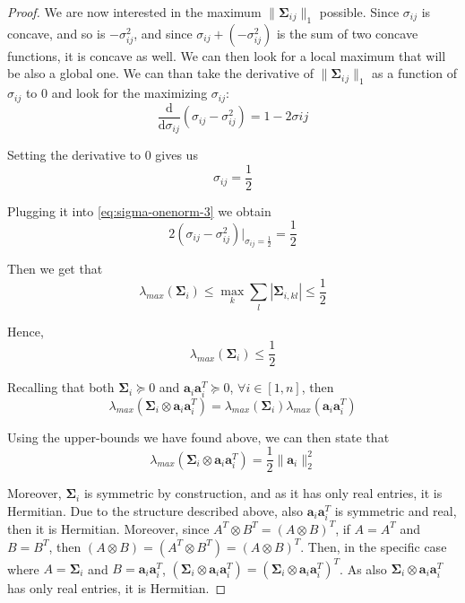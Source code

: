\documentclass[12pt]{article}
\newcommand{\aat}{\mathbf{a}_{i} \mathbf{a}_{i}^{T}}
\newcommand{\bigsigma}{\mathbf{\Sigma}_{i}}
\begin{document}
\begin{proof}
We are now interested in the maximum $\lVert \bigsigma{}_{j} \rVert_{1}$ possible. Since $\sigma_{ij}$ is concave, and so is $-\sigma_{ij}^{2}$, and since $\sigma_{ij} + (-\sigma_{ij}^{2})$ is the sum of two concave functions, it is concave as well. We can then look for a local maximum that will be also a global one. We can than take the derivative of $ \lVert \bigsigma{}_{j} \rVert_{1}$ as a function of $\sigma_{ij}$ to 0 and look for the maximizing $\sigma_{ij}$:
\begin{equation}
    \frac{\mathrm{d}}{\mathrm{d}\sigma_{ij}}(\sigma_{ij} - \sigma_{ij}^{2}) =  1 - 2 \sigma{ij}
\end{equation}

Setting the derivative to 0 gives us
\begin{equation}
    \sigma_{ij} = \frac{1}{2}
\end{equation}

Plugging it into \eqref{eq:sigma-onenorm-3} we obtain
\begin{equation}
    2(\sigma_{ij} - \sigma_{ij}^{2}) | _{\sigma_{ij} = \frac{1}{2}} = \frac{1}{2}
\end{equation}

Then we get that
\begin{equation}
    \lambda_{max}(\bigsigma) \leq \max_{k} \sum_{l} |\mathbf{\Sigma}_{i,kl}| \leq \frac{1}{2}
\end{equation}

Hence,
\begin{equation}
    \lambda_{max}(\bigsigma) \leq \frac{1}{2}
\end{equation}

Recalling that both $\bigsigma \succeq 0$ and $\aat \succeq 0$, $\forall i \in [1, n]$, then
\begin{equation}
    \lambda_{max}(\bigsigma \otimes \aat) = \lambda_{max}(\bigsigma) \lambda_{max}(\aat)
\end{equation}

Using the upper-bounds we have found above, we can then state that
\begin{equation}
    \lambda_{max}(\bigsigma \otimes \aat) = \frac{1}{2} \lVert \mathbf{a}_i \rVert_{2}^{2}
\end{equation}

Moreover, $\bigsigma$ is symmetric by construction, and as it has only real entries, it is Hermitian. Due to the structure described above, also $\aat$ is symmetric and real, then it is Hermitian. Moreover, since $A^T \otimes B^T = (A \otimes B)^T$, if $A = A^T$ and $B = B^T$, then $(A \otimes B) = (A^T \otimes B^T) = (A \otimes B)^T$. Then, in the specific case where $A = \bigsigma$ and $B = \aat$, $(\bigsigma \otimes \aat) = (\bigsigma \otimes \aat)^T$. As also $\bigsigma \otimes \aat$ has only real entries, it is Hermitian.


\end{proof}
\end{document}
